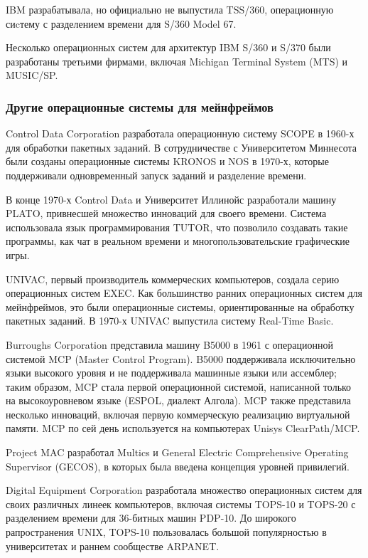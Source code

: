 IBM разрабатывала, но официально не выпустила TSS/360, операционную сиcтему с разделением времени для S/360 Model 67.

Несколько операционных систем для архитектур IBM S/360 и S/370 были разработаны третьими фирмами, включая Michigan Terminal System (MTS) и MUSIC/SP.

\subsubsection{Другие операционные системы для мейнфреймов}
Control Data Corporation разработала операционную систему SCOPE в 1960-х для обработки пакетных заданий. В сотрудничестве с Университетом Миннесота были созданы операционные системы KRONOS и NOS в 1970-х, которые поддерживали одновременный запуск заданий и разделение времени.

В конце 1970-х Control Data и Университет Иллинойс разработали машину PLATO, привнесшей множество инноваций для своего времени. Система использовала язык программирования TUTOR, что позволило создавать такие программы, как чат в реальном времени и многопользовательские графические игры.

UNIVAC, первый производитель коммерческих компьютеров, создала серию операционных систем EXEC. Как большинство ранних операционных систем для мейнфреймов, это были операционные системы, ориентированные на обработку пакетных заданий. В 1970-х UNIVAC выпустила систему Real-Time Basic.

Burroughs Corporation представила машину B5000 в 1961 с операционной системой MCP (Master Control Program). B5000 поддерживала исключительно языки высокого уровня и не поддерживала машинные языки или ассемблер; таким образом, MCP стала первой операционной системой, написанной только на высокоуровневом языке (ESPOL, диалект Алгола). MCP также представила несколько инноваций, включая первую коммерческую реализацию виртуальной памяти. MCP по сей день используется на компьютерах Unisys ClearPath/MCP.

Project MAC разработал Multics и General Electric Comprehensive Operating Supervisor (GECOS), в которых была введена концепция уровней привилегий.

Digital Equipment Corporation разработала множество операционных систем для своих различных линеек компьютеров, включая системы TOPS-10 и TOPS-20 с разделением времени для 36-битных машин PDP-10. До широкого рапространения UNIX, TOPS-10 пользовалась большой популярностью в университетах и раннем сообществе ARPANET.

